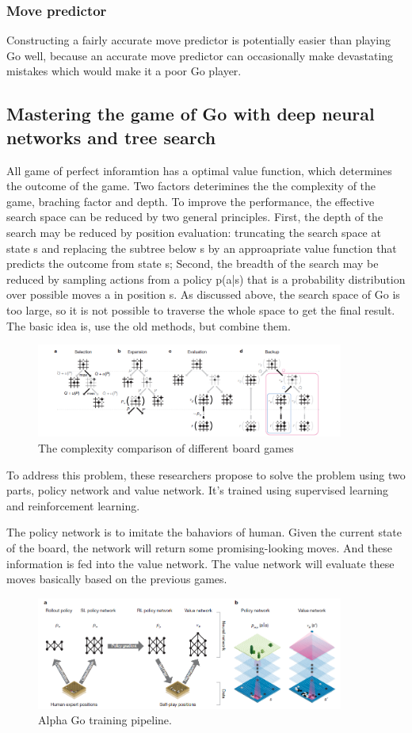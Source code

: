 \subsubsection{Move predictor}
Constructing a fairly accurate move predictor is potentially easier than playing Go well, because an accurate move predictor can occasionally make devastating mistakes which would make it a poor Go player.
\subsection{Mastering the game of Go with deep neural networks and tree search~\cite{silver2016mastering}}
All game of perfect inforamtion has a optimal value function, which determines the outcome of the game. Two factors deterimines the the complexity of the game, braching factor and depth. To improve the performance, the effective search space can be reduced by two general principles. First, the depth of the search may be reduced by position evaluation: truncating the search space at state s and replacing the subtree below s by an approapriate value function that predicts the outcome from state s; Second, the breadth of the search may be reduced by sampling actions from a policy p(a|s) that is a probability distribution over possible moves a in position s. As discussed above, the search space of Go is too large, so it is not possible to traverse the whole space to get the final result. The basic idea is, use the old methods, but combine them. 
\begin{figure}[!ht]
  \caption{The complexity comparison of different board games}
  \centering
    \includegraphics[width=0.9\textwidth]{MCTS-AlphaGo.png}
\end{figure}
To address this problem, these researchers propose to solve the problem using two parts, policy network and value network. It's trained using supervised learning and reinforcement learning.

The policy network is to imitate the bahaviors of human. Given the current state of the board, the network will return some promising-looking moves. And these information is fed into the value network. The value network will evaluate these moves basically based on the previous games.
\begin{figure}[!ht]
  \caption{Alpha Go training pipeline.}
  \centering
    \includegraphics[width=0.9\textwidth]{AlphaGoTrainingPipeline.png}
\end{figure}
